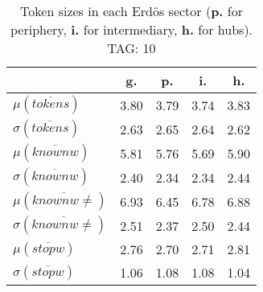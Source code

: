 \begin{table}[h!]
\begin{center}
\begin{tabular}{| l | c | c | c | c |}\hline
 & g. & p. & i. & h. \\\hline
$\mu(\overline{tokens})$ & 3.80  & 3.79  & 3.74  & 3.83 \\\hline
$\sigma(\overline{tokens})$ & 2.63  & 2.65  & 2.64  & 2.62 \\\hline
$\mu(\overline{knownw})$ & 5.81  & 5.76  & 5.69  & 5.90 \\\hline
$\sigma(\overline{knownw})$ & 2.40  & 2.34  & 2.34  & 2.44 \\\hline
$\mu(\overline{knownw \neq})$ & 6.93  & 6.45  & 6.78  & 6.88 \\\hline
$\sigma(\overline{knownw \neq})$ & 2.51  & 2.37  & 2.50  & 2.44 \\\hline
$\mu(\overline{stopw})$ & 2.76  & 2.70  & 2.71  & 2.81 \\\hline
$\sigma(\overline{stopw})$ & 1.06  & 1.08  & 1.08  & 1.04 \\\hline
\end{tabular}
\caption{Token sizes in each Erd\"os sector ({{\bf p.}} for periphery, {{\bf i.}} for intermediary, {{\bf h.}} for hubs). TAG: 10}
\end{center}
\end{table}